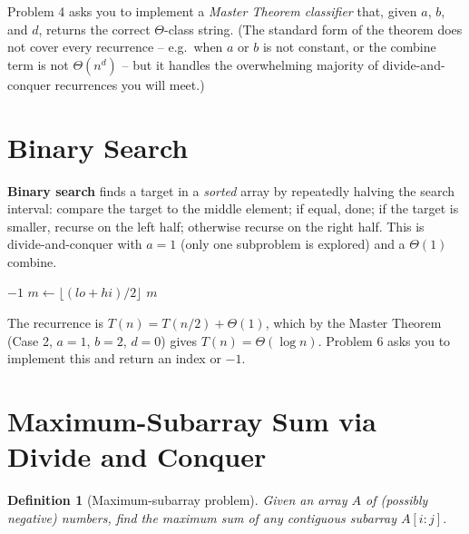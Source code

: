 \documentclass[11pt]{article}
\newtheorem{definition}[theorem]{Definition}
\begin{document}
Problem 4 asks you to implement a \emph{Master Theorem classifier} that, given $a$, $b$, and
$d$, returns the correct $\Theta$-class string. (The standard form of the theorem does not
cover every recurrence -- e.g.\ when $a$ or $b$ is not constant, or the combine term is not
$\Theta(n^d)$ -- but it handles the overwhelming majority of divide-and-conquer recurrences
you will meet.)

\section{Binary Search}

\textbf{Binary search} finds a target in a \emph{sorted} array by repeatedly halving the
search interval: compare the target to the middle element; if equal, done; if the target is
smaller, recurse on the left half; otherwise recurse on the right half. This is
divide-and-conquer with $a = 1$ (only one subproblem is explored) and a $\Theta(1)$ combine.

\begin{algorithm}[h]
\caption{Binary search (recursive)}
\begin{algorithmic}[1]
     \State \Return $-1$  \EndIf
    \State $m \gets \lfloor (\mathit{lo} + \mathit{hi})/2 \rfloor$
     \State \Return $m$
     \State \Return {}
    \Else \State \Return {}
    \EndIf
\EndFunction
\end{algorithmic}
\end{algorithm}

The recurrence is $T(n) = T(n/2) + \Theta(1)$, which by the Master Theorem (Case 2, $a=1$,
$b=2$, $d=0$) gives $T(n) = \Theta(\log n)$. Problem 6 asks you to implement this and return
an index or $-1$.

\section{Maximum-Subarray Sum via Divide and Conquer}

\begin{definition}[Maximum-subarray problem]
Given an array $A$ of (possibly negative) numbers, find the maximum sum of any
\emph{contiguous} subarray $A[i\mathbin{:}j]$.
\end{definition}
\end{document}
